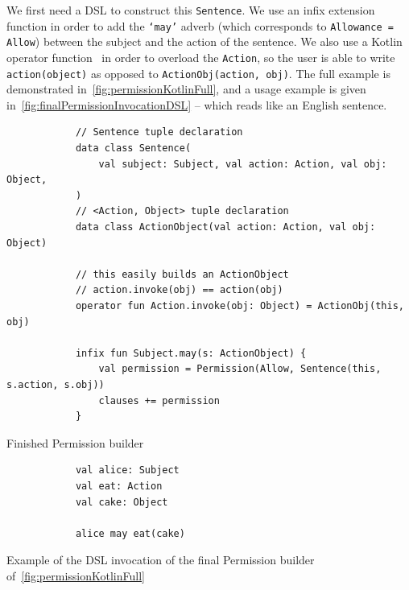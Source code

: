 We first need a DSL to construct this \texttt{Sentence}.
We use an infix extension function in order to add the \texttt{`may'} adverb (which corresponds to \texttt{Allowance = Allow}) between the subject and the action of the sentence.
We also use a Kotlin operator function~\cite{kotlinInvokeOperator} in order to overload the \texttt{Action}, so the user is able to write \texttt{action(object)} as opposed to \texttt{ActionObj(action, obj)}.
The full example is demonstrated in~\autoref{fig:permissionKotlinFull}, and a usage example is given in~\autoref{fig:finalPermissionInvocationDSL} -- which reads like an English sentence.



\begin{listing}[h]
    \centering
    \begin{minipage}{\textwidth}
        \begin{verbatim}
            // Sentence tuple declaration
            data class Sentence(
                val subject: Subject, val action: Action, val obj: Object,
            )
            // <Action, Object> tuple declaration
            data class ActionObject(val action: Action, val obj: Object)

            // this easily builds an ActionObject
            // action.invoke(obj) == action(obj)
            operator fun Action.invoke(obj: Object) = ActionObj(this, obj)

            infix fun Subject.may(s: ActionObject) {
                val permission = Permission(Allow, Sentence(this, s.action, s.obj))
                clauses += permission
            }
        \end{verbatim}
    \end{minipage}
    \caption{Finished Permission builder}
    \label{fig:permissionKotlinFull}
\end{listing}



\begin{listing}[h]
    \centering
    \begin{minipage}{0.25\textwidth}
        \begin{verbatim}
            val alice: Subject
            val eat: Action
            val cake: Object

            alice may eat(cake)
        \end{verbatim}
    \end{minipage}
    \caption{Example of the DSL invocation of the final Permission builder of~\autoref{fig:permissionKotlinFull}}
    \label{fig:finalPermissionInvocationDSL}
\end{listing}

